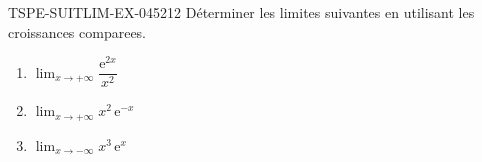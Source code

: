 \begin{exercice}{TSPE-SUITLIM-EX-045}{2}{12}
Déterminer les limites suivantes en utilisant les croissances comparees.
\begin{enumerate}
  \item $\lim_{x \to +\infty} \dfrac{\mathrm{e}^{2x}}{x^2}$
  \item $\lim_{x \to +\infty} x^2\,\mathrm{e}^{-x}$
  \item $\lim_{x \to -\infty} x^3\,\mathrm{e}^x$
\end{enumerate}
\end{exercice}
